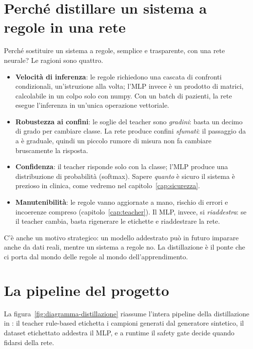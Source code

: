 \section{Perché distillare un sistema a regole in una rete}\label{sec:perche-distillare}

Perché sostituire un sistema a regole, semplice e trasparente, con una rete
neurale? Le ragioni sono quattro.

\begin{itemize}
  \item \textbf{Velocità di inferenza}: le regole richiedono una cascata di
        confronti condizionali, un'istruzione alla volta; l'MLP invece è un
        prodotto di matrici, calcolabile in un colpo solo con numpy. Con un
        batch di pazienti, la rete esegue l'inferenza in un'unica operazione
        vettoriale.
  \item \textbf{Robustezza ai confini}: le soglie del teacher sono
        \emph{gradini}: basta un decimo di grado per cambiare classe. La
        rete produce confini \emph{sfumati}: il passaggio da
         a  è graduale, quindi un piccolo rumore
        di misura non fa cambiare bruscamente la risposta.
  \item \textbf{Confidenza}: il teacher risponde solo con la classe; l'MLP
        produce una distribuzione di probabilità (softmax). Sapere
        \emph{quanto} è sicuro il sistema è prezioso in clinica, come
        vedremo nel capitolo~\ref{cap:sicurezza}.
  \item \textbf{Manutenibilità}: le regole vanno aggiornate a mano, rischio
        di errori e incoerenze compreso (capitolo~\ref{cap:teacher}). Il
        MLP, invece, si \emph{riaddestra}: se il teacher cambia, basta
        rigenerare le etichette e riaddestrare la rete.
\end{itemize}

C'è anche un motivo strategico: un modello addestrato può in futuro
imparare anche da dati reali, mentre un sistema a regole no. La
distillazione è il ponte che ci porta dal mondo delle regole al mondo
dell'apprendimento.

\section{La pipeline del progetto}\label{sec:pipeline-progetto}

La figura~\ref{fig:diagramma-distillazione} riassume l'intera pipeline
della distillazione in \progetto{}: il teacher rule-based etichetta i
campioni generati dal generatore sintetico, il dataset etichettato
addestra il MLP, e a runtime il safety gate decide quando fidarsi della
rete.

